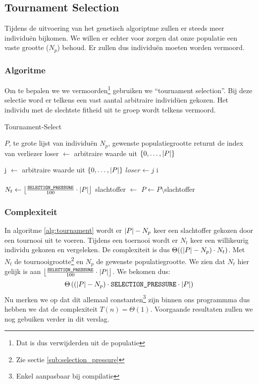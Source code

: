%
\subsection{Tournament Selection}
\label{sub:tournament}
Tijdens de uitvoering van het genetisch algoriptme zullen er steeds meer individuën bijkomen. We willen er echter voor zorgen dat onze populatie een vaste grootte ($N_p$) behoud. Er zullen dus individuën moeten worden vermoord.
\subsubsection{Algoritme}
Om te bepalen we we vermoorden\footnote{Dat is dus verwijderden uit de populatie} gebruiken we ``tournament selection''. Bij deze selectie word er telkens een vast aantal arbitraire individüen gekozen. Het individu met de slechtste fitheid uit te groep wordt telkens vermoord.
	\begin{algorithm}[H]
	 	\caption{Tournament-Select}
		\begin{algorithmic}
		\Require 
			\State $P$, te grote lijst van individuën 
			\State $N_p$, gewenste populatiegrootte
		\Ensure returnt de index van verliezer
		\State loser $\gets$ arbitraire waarde uit $\lbrace 0, \dots, \lvert P \rvert \rbrace$

		\State j $\gets$ arbitraire waarde uit $\lbrace 0, \dots, \lvert P \rvert \rbrace$
			\State $loser \gets j$
		\EndIf
		\EndFor		
		\State \Return i
		\EndFunction
		\\
		\\
			\State $N_t \gets \left\lfloor\frac{\texttt{SELECTION\_PRESSURE}}{100} \cdot \lvert P \rvert\right\rfloor$ 
			\State slachtoffer $\gets$ 
			\State $P \gets P\setminus$slachtoffer
		\EndWhile
		
		\end{algorithmic}
		\label{alg:tournament}
	\end{algorithm}		
\subsubsection{Complexiteit}
In algoritme \ref{alg:tournament} wordt er $\lvert P \rvert-N_p$ keer een slachtoffer gekozen door een tournooi uit te voeren. Tijdens een toernooi wordt er $N_t$ keer een willikeurig individu gekozen en vergeleken. De complexiteit is dus $\Theta((\lvert P \rvert-N_p)\cdot N_t)$. Met $N_t$ de tournooigrootte\footnote{Zie sectie \ref{sub:selection_pressure}} en $N_p$ de gewenste populatiegrootte. We zien dat $N_t$ hier gelijk is aan
 $\left\lfloor\frac{\texttt{SELECTION\_PRESSURE}}{100} \cdot \lvert P \rvert\right\rfloor$.
 We bekomen dus: \[\Theta\left(\left(\lvert P \rvert-N_p\right)\cdot \texttt{SELECTION\_PRESSURE} \cdot \lvert P \rvert\right)\]
 Nu merken we op dat dit allemaal constanten\footnote{Enkel aanpasbaar bij compilatie} zijn binnen ons programmma dus hebben we dat de complexiteit $T(n) = \Theta(1)$. Voorgaande resultaten zullen we nog gebuiken verder in dit verslag. %

